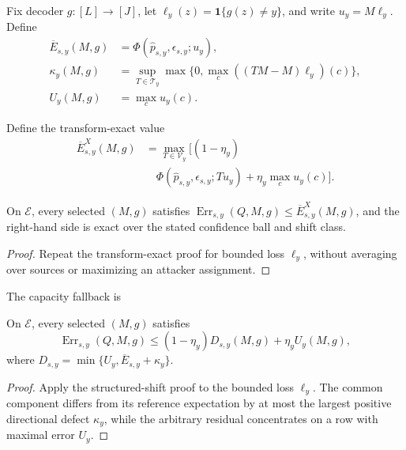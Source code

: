 Fix decoder $g:[L]\to[J]$, let
$\ell_y(z)=\mathbf 1\{g(z)\neq y\}$, and write
$u_y=M\ell_y$. Define
\begin{align}
 \overline E_{s,y}(M,g)&=
 \Phi(\widehat p_{s,y},\epsilon_{s,y};u_y),\\
 \kappa_y(M,g)&=\sup_{T\in\mathcal T_y}
 \max\{0,\max_c((TM-M)\ell_y)(c)\},\\
 U_y(M,g)&=\max_cu_y(c).
\end{align}

Define the transform-exact value
\begin{equation}
 \begin{aligned}
 \overline E^X_{s,y}(M,g)
 &=\max_{T\in\mathcal V_y}\Big[(1-\eta_y)
 \\[-2pt]&\quad\Phi(\widehat p_{s,y},\epsilon_{s,y};Tu_y)
 +\eta_y\max_cu_y(c)\Big].
 \end{aligned}
 \label{supp:eq:exactutilityconfidence}
\end{equation}

\begin{corollary}
On $\mathcal E$, every selected $(M,g)$ satisfies
$\operatorname{Err}_{s,y}(Q,M,g)\leq\overline E^X_{s,y}(M,g)$, and the
right-hand side is exact over the stated confidence ball and shift class.
\end{corollary}

\begin{proof}
Repeat the transform-exact proof for bounded loss $\ell_y$, without averaging
over sources or maximizing an attacker assignment.
\end{proof}

The capacity fallback is
\begin{corollary}
On $\mathcal E$, every selected $(M,g)$ satisfies
\begin{equation}
 \operatorname{Err}_{s,y}(Q,M,g)\leq
 (1-\eta_y)D_{s,y}(M,g)+\eta_yU_y(M,g),
 \label{supp:eq:utility}
\end{equation}
where
$D_{s,y}=\min\{U_y,\overline E_{s,y}+\kappa_y\}$.
\end{corollary}

\begin{proof}
Apply the structured-shift proof to the bounded loss $\ell_y$. The common
component differs from its reference expectation by at most the largest
positive directional defect $\kappa_y$, while the arbitrary residual
concentrates on a row with maximal error $U_y$.
\end{proof}

